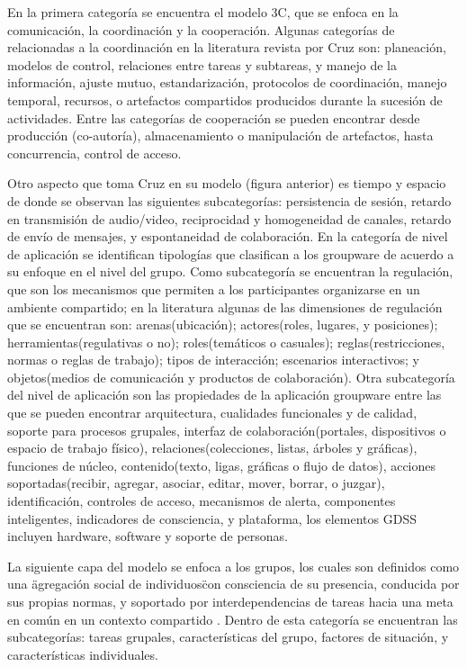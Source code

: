 En la primera categor\'ia se encuentra el modelo 3C, que se enfoca en la comunicaci\'on, la coordinaci\'on y la cooperaci\'on.  Algunas categor\'ias de relacionadas a la coordinaci\'on en la literatura revista por Cruz \cite{cruz2012towards} son: planeaci\'on, modelos de control, relaciones entre tareas y subtareas, y manejo de la informaci\'on, ajuste mutuo, estandarizaci\'on, protocolos de coordinaci\'on, manejo temporal, recursos, o artefactos compartidos producidos durante la sucesi\'on de actividades. Entre las categor\'ias de cooperaci\'on se pueden encontrar desde producci\'on (co-autor\'ia), almacenamiento o manipulaci\'on de artefactos, hasta concurrencia, control de acceso.

Otro aspecto que toma Cruz en su modelo (figura anterior) es tiempo y espacio de donde se observan las siguientes subcategor\'ias: persistencia de sesi\'on, retardo en transmisi\'on de audio/video, reciprocidad y homogeneidad de canales, retardo de env\'io de mensajes, y espontaneidad de colaboraci\'on. En la categor\'ia de nivel de aplicaci\'on se identifican tipolog\'ias que clasifican a los groupware de acuerdo a su enfoque en el nivel del grupo. Como subcategor\'ia se encuentran la regulaci\'on, que son los mecanismos que permiten a los participantes organizarse en un ambiente compartido; en la literatura algunas de las dimensiones de regulaci\'on que se encuentran son: arenas(ubicaci\'on); actores(roles, lugares, y posiciones); herramientas(regulativas o no); roles(tem\'aticos o casuales); reglas(restricciones, normas o reglas de trabajo); tipos de interacci\'on; escenarios interactivos; y objetos(medios de comunicaci\'on y productos de colaboraci\'on). Otra subcategor\'ia del nivel de aplicaci\'on son las propiedades de la aplicaci\'on groupware entre las que se pueden encontrar arquitectura, cualidades funcionales y de calidad, soporte para procesos grupales, interfaz de colaboraci\'on(portales, dispositivos o espacio de trabajo f\'isico), relaciones(colecciones, listas, \'arboles y gr\'aficas), funciones de n\'ucleo, contenido(texto, ligas, gr\'aficas o flujo de datos), acciones soportadas(recibir, agregar, asociar, editar, mover, borrar, o juzgar), identificaci\'on, controles de acceso, mecanismos de alerta, componentes inteligentes, indicadores de consciencia, y plataforma, los elementos GDSS incluyen hardware, software y soporte de personas.

La siguiente capa del modelo se enfoca a los grupos, los cuales son definidos como una \"agregaci\'on social de individuos\" con consciencia de su presencia, conducida por sus propias normas, y soportado por interdependencias de tareas hacia una meta en com\'un en un contexto compartido \cite{pumareja2002evolutionary}. Dentro de esta categor\'ia se encuentran las subcategor\'ias: tareas grupales, caracter\'isticas del grupo, factores de situaci\'on, y caracter\'isticas individuales.

